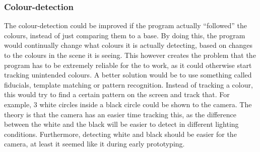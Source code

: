 \subsubsection*{Colour-detection}
The colour-detection could be improved if the program actually “followed” the colours, instead of just comparing them to a base. By doing this, the program would continually change what colours it is actually detecting, based on changes to the colours in the scene it is seeing. This however creates the problem that the program has to be extremely reliable for the to work, as it could otherwise start tracking unintended colours.
A better solution would be to use something called fiducials, template matching or pattern recognition. Instead of tracking a colour, this would try to find a certain pattern on the screen and track that. For example, 3 white circles inside a black circle could be shown to the camera. The theory is that the camera has an easier time tracking this, as the difference between the white and the black will be easier to detect in different lighting conditions. Furthermore, detecting white and black should be easier for the camera, at least it seemed like it during early prototyping.


